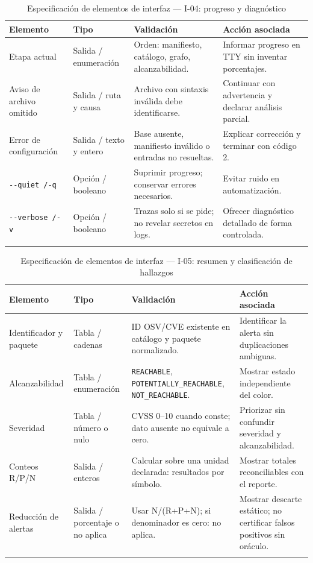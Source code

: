 \begin{table}[H]
\centering\small{}
\caption{Especificación de elementos de interfaz --- I-04: progreso y diagnóstico}
\begin{tabularx}{\textwidth}{P{3.0cm}P{2.3cm}YY}
\toprule
\textbf{Elemento} & \textbf{Tipo} & \textbf{Validación} & \textbf{Acción asociada} \\
\midrule
Etapa actual & Salida / enumeración & Orden: manifiesto, catálogo, grafo, alcanzabilidad. & Informar progreso en TTY sin inventar porcentajes. \\
\addlinespace
Aviso de archivo omitido & Salida / ruta y causa & Archivo con sintaxis inválida debe identificarse. & Continuar con advertencia y declarar análisis parcial. \\
\addlinespace
Error de configuración & Salida / texto y entero & Base ausente, manifiesto inválido o entradas no resueltas. & Explicar corrección y terminar con código 2. \\
\addlinespace
\texttt{-\allowbreak -\allowbreak quiet /\allowbreak  -\allowbreak q} & Opción / booleano & Suprimir progreso; conservar errores necesarios. & Evitar ruido en automatización. \\
\addlinespace
\texttt{-\allowbreak -\allowbreak verbose /\allowbreak  -\allowbreak v} & Opción / booleano & Trazas solo si se pide; no revelar secretos en logs. & Ofrecer diagnóstico detallado de forma controlada. \\
\addlinespace
\bottomrule
\end{tabularx}
\end{table}


\begin{table}[H]
\centering\small{}
\caption{Especificación de elementos de interfaz --- I-05: resumen y clasificación de hallazgos}
\begin{tabularx}{\textwidth}{P{3.0cm}P{2.3cm}YY}
\toprule
\textbf{Elemento} & \textbf{Tipo} & \textbf{Validación} & \textbf{Acción asociada} \\
\midrule
Identificador y paquete & Tabla / cadenas & ID OSV/CVE existente en catálogo y paquete normalizado. & Identificar la alerta sin duplicaciones ambiguas. \\
\addlinespace
Alcanzabilidad & Tabla / enumeración & \texttt{REACHABLE}, \texttt{POTENTIALLY\_\allowbreak REACHABLE}, \texttt{NOT\_\allowbreak REACHABLE}. & Mostrar estado independiente del color. \\
\addlinespace
Severidad & Tabla / número o nulo & CVSS 0--10 cuando conste; dato ausente no equivale a cero. & Priorizar sin confundir severidad y alcanzabilidad. \\
\addlinespace
Conteos R/P/N & Salida / enteros & Calcular sobre una unidad declarada: resultados por símbolo. & Mostrar totales reconciliables con el reporte. \\
\addlinespace
Reducción de alertas & Salida / porcentaje o no aplica & Usar N/(R+P+N); si denominador es cero: no aplica. & Mostrar descarte estático; no certificar falsos positivos sin oráculo. \\
\addlinespace
\bottomrule
\end{tabularx}
\end{table}



